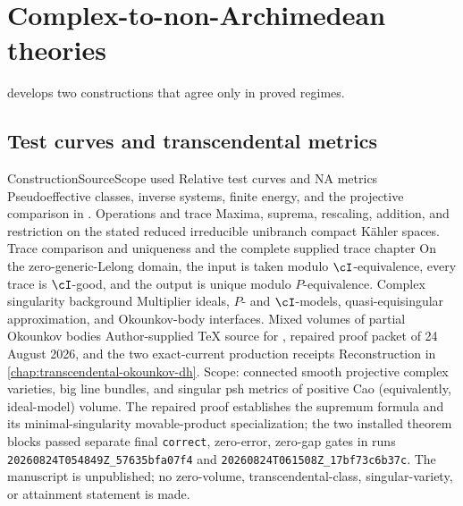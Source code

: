 \section{Complex-to-non-Archimedean theories}
\label{sec:appL-transcendental}

 develops two constructions that agree only in proved regimes.

\subsection{Test curves and transcendental metrics}
\label{sec:appL-transcendental-tests}

\begin{AppLProvenanceLedger}{Construction}{Source}{Scope used}
\AppLProvenanceRecord
  {Relative test curves and NA metrics}
  {\cite{DXZ23}}
  {Pseudoeffective classes, inverse systems, finite energy, and the
   projective comparison in
   .}
\AppLProvenanceRecord
  {Operations and trace}
  {\cite{Xia23Operations}}
  {Maxima, suprema, rescaling, addition, and restriction on the stated
   reduced irreducible unibranch compact Kähler spaces.}
\AppLProvenanceRecord
  {Trace comparison and uniqueness}
  {\cite{DX24} and the complete supplied trace chapter}
  {On the zero-generic-Lelong domain, the input is taken modulo
   \(\cI\)-equivalence, every trace is \(\cI\)-good, and the output is
   unique modulo \(P\)-equivalence.}
\AppLProvenanceRecord
  {Complex singularity background}
  {\cite{XiaBook}}
  {Multiplier ideals, \(P\)- and \(\cI\)-models, quasi-equisingular
   approximation, and Okounkov-body interfaces.}
\AppLProvenanceRecord
  {Mixed volumes of partial Okounkov bodies}
  {Author-supplied TeX source for \cite{XiaMVOB}, repaired proof packet of
   24 August 2026, and the two exact-current production receipts}
  {Reconstruction in \cref{chap:transcendental-okounkov-dh}.  Scope:
   connected smooth projective complex varieties, big line bundles, and
   singular psh metrics of positive Cao (equivalently, ideal-model) volume.
   The repaired proof establishes the supremum formula and its
   minimal-singularity movable-product specialization; the two installed
   theorem blocks passed separate final \texttt{correct}, zero-error,
   zero-gap gates in runs \nolinkurl{20260824T054849Z_57635bfa07f4} and
   \nolinkurl{20260824T061508Z_17bf73c6b37c}.  The manuscript is
   unpublished; no zero-volume, transcendental-class, singular-variety, or
   attainment statement is made.}
\end{AppLProvenanceLedger}


